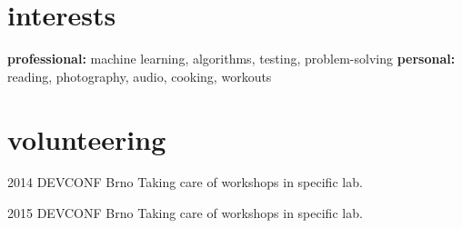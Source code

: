 \documentclass[]{friggeri-cv} %
\begin{document}

\section{interests}

\textbf{professional:} machine learning, algorithms, testing, problem-solving \textbf{personal:} reading, photography, audio, cooking, workouts


\section{volunteering}

\begin{entrylist}

\entry
{2014}
{DEVCONF}
{Brno}
{Taking care of workshops in specific lab.}

\entry
{2015}
{DEVCONF}
{Brno}
{Taking care of workshops in specific lab.}

\end{entrylist}

\end{document}
